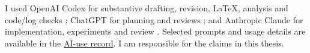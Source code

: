 \label{front:provenance}
I used OpenAI Codex for substantive drafting, revision, LaTeX, analysis
and code/log checks \cite{ai_codex_record}; ChatGPT for planning and
reviews \cite{ai_chatgpt_record}; and Anthropic Claude for implementation,
experiments and review \cite{ai_claude_record}.
Selected prompts and usage details are available in the
\href{https://github.com/lrlorry/8800_report/blob/main/docs/ai-use-record.md}{AI-use record}.
I am responsible for the claims in this thesis.
